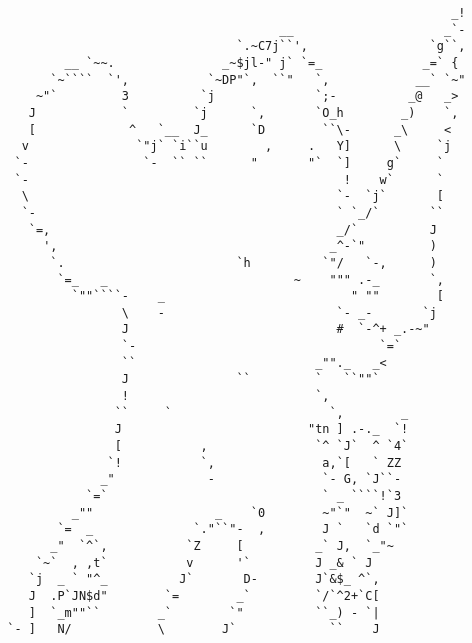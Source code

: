 \documentclass[preview, varwidth]{standalone}
\begin{document}
\begin{small}
    \begin{verbatim}
                                                                _!
                                        __                     _`-
                                  `.~C7j``',                 `g``,
          __ `~~.               _~$jl-" j` `=_              _=` { 
        `~````  `',           `~DP"`,  ``"   `,            __` `~"
      ~"`         3          `j              `;-          _@   _> 
     J            `         `j      `,       `O_h        _)    `, 
     [             ^   `__  J_      `D        ``\-      _\     <  
    v               `"j` `i``u        ,     .   Y]      \     `j  
   `-                `-  `` ``      "       "`  `]     g`     `   
   `-                                            !    w`      `   
    \                                           `-  `j`       [   
    `-                                          ` `_/`       ``   
     `=,                                        _/`          J    
       ',                                      _^-`"         )    
        `.                        `h          `"/   `-,      )    
         `=_   _                          ~    """ .-_       `,   
           `""````-    _                          " ""        [   
                  \    -                        `- _-       `j    
                  J                             #  `-^+ _.-~"     
                  `-                                  `=`         
                  ``                         _""._   _<           
                  J               ``         `   ``""`            
                  !                          `,                   
                 ``     `                      `,        _        
                 J                          "tn ] .-._  `!        
                 [           ,               `^ `J`  ^ `4`        
                `!           `,               a,`[   ` ZZ         
               _"             -               `- G, `J``-         
             `=`                              ` _ ````!`3         
           _""                 _    `0        ~"`"  ~` J]`        
         `=  _              `."``"-  ,        J `   `d `"`        
        _"  `^`,           `Z     [          _` J,  `_"~          
      `~`  , ,t`           v      '`         J _& ` J             
     `j  _ ` "^_          J`       D-        J`&$_ ^`,            
     J  .P`JN$d"        `=        _`         `/`^2+`C[            
     ]  `_m""``        _`        `"          ``_) - `|            
  `- ]   N/            \        J`             ``    J            

\end{verbatim}
\end{small}
\end{document}
